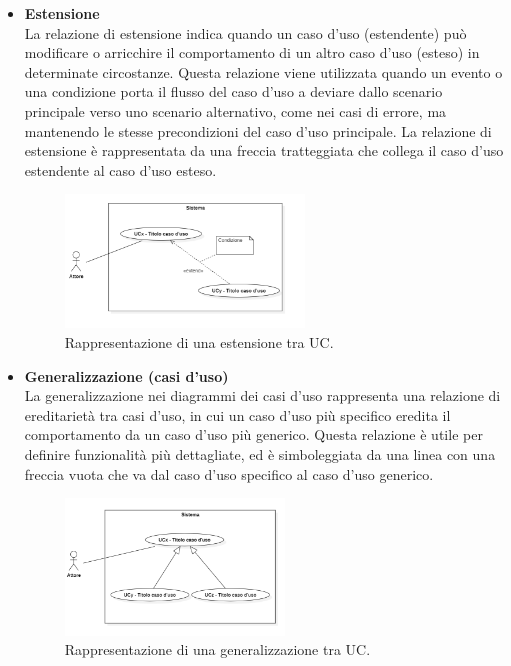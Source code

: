 \documentclass[10pt]{article}
\begin{document}
\begin{justify}
\begin{itemize}
            \item \textbf{Estensione}\\
            La relazione di estensione indica quando un caso d'uso (estendente) può modificare o arricchire il comportamento di un altro caso d'uso (esteso) in determinate circostanze. Questa relazione viene utilizzata quando un evento o una condizione porta il flusso del caso d'uso a deviare dallo scenario principale verso uno scenario alternativo, come nei casi di errore, ma mantenendo le stesse precondizioni del caso d'uso principale. La relazione di estensione è rappresentata da una freccia tratteggiata che collega il caso d'uso estendente al caso d'uso esteso.
            \begin{figure}[H]
            \centering
            \includegraphics[width=0.6\textwidth]{EstensioneUC.PNG}
            \caption{Rappresentazione di una estensione tra UC.}
            \end{figure}

            \item \textbf{Generalizzazione (casi d'uso)}\\
            La generalizzazione nei diagrammi dei casi d'uso rappresenta una relazione di ereditarietà tra casi d'uso, in cui un caso d'uso più specifico eredita il comportamento da un caso d'uso più generico. Questa relazione è utile per definire funzionalità più dettagliate, ed è simboleggiata da una linea con una freccia vuota che va dal caso d'uso specifico al caso d'uso generico.
            \begin{figure}[H]
            \centering
            \includegraphics[width=0.55\textwidth]{GeneralizzazioneUC.PNG}
            \caption{Rappresentazione di una generalizzazione tra UC.}
            \end{figure}
        \end{itemize}


\end{justify}
\end{document}
